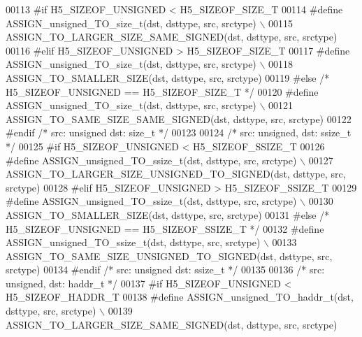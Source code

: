 \begin{DoxyCode}
00113 \textcolor{preprocessor}{#if H5\_SIZEOF\_UNSIGNED < H5\_SIZEOF\_SIZE\_T}
00114 \textcolor{preprocessor}{    #define ASSIGN\_unsigned\_TO\_size\_t(dst, dsttype, src, srctype) \(\backslash\)}
00115 \textcolor{preprocessor}{        ASSIGN\_TO\_LARGER\_SIZE\_SAME\_SIGNED(dst, dsttype, src, srctype)}
00116 \textcolor{preprocessor}{#elif H5\_SIZEOF\_UNSIGNED > H5\_SIZEOF\_SIZE\_T}
00117 \textcolor{preprocessor}{    #define ASSIGN\_unsigned\_TO\_size\_t(dst, dsttype, src, srctype) \(\backslash\)}
00118 \textcolor{preprocessor}{        ASSIGN\_TO\_SMALLER\_SIZE(dst, dsttype, src, srctype)}
00119 \textcolor{preprocessor}{#else }\textcolor{comment}{/* H5\_SIZEOF\_UNSIGNED == H5\_SIZEOF\_SIZE\_T */}\textcolor{preprocessor}{}
00120 \textcolor{preprocessor}{    #define ASSIGN\_unsigned\_TO\_size\_t(dst, dsttype, src, srctype) \(\backslash\)}
00121 \textcolor{preprocessor}{        ASSIGN\_TO\_SAME\_SIZE\_SAME\_SIGNED(dst, dsttype, src, srctype)}
00122 \textcolor{preprocessor}{#endif }\textcolor{comment}{/* src: unsigned dst: size\_t */}\textcolor{preprocessor}{}
00123 
00124 \textcolor{comment}{/* src: unsigned, dst: ssize\_t */}
00125 \textcolor{preprocessor}{#if H5\_SIZEOF\_UNSIGNED < H5\_SIZEOF\_SSIZE\_T}
00126 \textcolor{preprocessor}{    #define ASSIGN\_unsigned\_TO\_ssize\_t(dst, dsttype, src, srctype) \(\backslash\)}
00127 \textcolor{preprocessor}{        ASSIGN\_TO\_LARGER\_SIZE\_UNSIGNED\_TO\_SIGNED(dst, dsttype, src, srctype)}
00128 \textcolor{preprocessor}{#elif H5\_SIZEOF\_UNSIGNED > H5\_SIZEOF\_SSIZE\_T}
00129 \textcolor{preprocessor}{    #define ASSIGN\_unsigned\_TO\_ssize\_t(dst, dsttype, src, srctype) \(\backslash\)}
00130 \textcolor{preprocessor}{        ASSIGN\_TO\_SMALLER\_SIZE(dst, dsttype, src, srctype)}
00131 \textcolor{preprocessor}{#else }\textcolor{comment}{/* H5\_SIZEOF\_UNSIGNED == H5\_SIZEOF\_SSIZE\_T */}\textcolor{preprocessor}{}
00132 \textcolor{preprocessor}{    #define ASSIGN\_unsigned\_TO\_ssize\_t(dst, dsttype, src, srctype) \(\backslash\)}
00133 \textcolor{preprocessor}{        ASSIGN\_TO\_SAME\_SIZE\_UNSIGNED\_TO\_SIGNED(dst, dsttype, src, srctype)}
00134 \textcolor{preprocessor}{#endif }\textcolor{comment}{/* src: unsigned dst: ssize\_t */}\textcolor{preprocessor}{}
00135 
00136 \textcolor{comment}{/* src: unsigned, dst: haddr\_t */}
00137 \textcolor{preprocessor}{#if H5\_SIZEOF\_UNSIGNED < H5\_SIZEOF\_HADDR\_T}
00138 \textcolor{preprocessor}{    #define ASSIGN\_unsigned\_TO\_haddr\_t(dst, dsttype, src, srctype) \(\backslash\)}
00139 \textcolor{preprocessor}{        ASSIGN\_TO\_LARGER\_SIZE\_SAME\_SIGNED(dst, dsttype, src, srctype)}

\end{DoxyCode}
